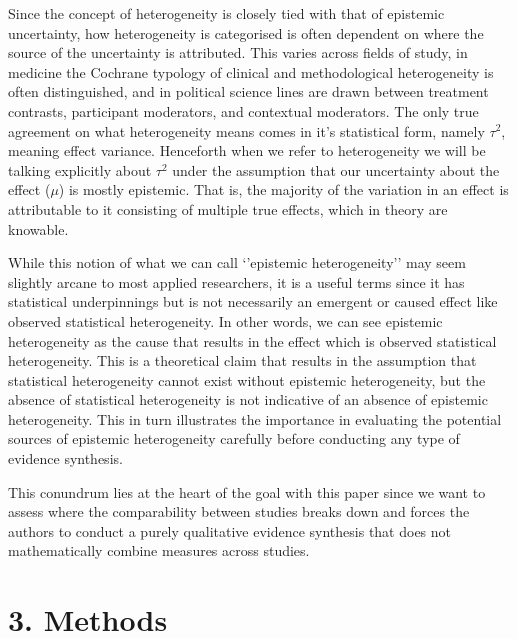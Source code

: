 \documentclass[
  letterpaper,
  DIV=11,
  numbers=noendperiod]{scrartcl}
\begin{document}
Since the concept of heterogeneity is closely tied with that of
epistemic uncertainty, how heterogeneity is categorised is often
dependent on where the source of the uncertainty is attributed. This
varies across fields of study, in medicine the Cochrane typology of
clinical and methodological heterogeneity is often distinguished, and in
political science lines are drawn between treatment contrasts,
participant moderators, and contextual moderators. The only true
agreement on what heterogeneity means comes in it's statistical form,
namely \(\tau^2\), meaning effect variance. Henceforth when we refer to
heterogeneity we will be talking explicitly about \(\tau^2\) under the
assumption that our uncertainty about the effect (\(\mu\)) is mostly
epistemic. That is, the majority of the variation in an effect is
attributable to it consisting of multiple true effects, which in theory
are knowable.

While this notion of what we can call `'epistemic heterogeneity'' may
seem slightly arcane to most applied researchers, it is a useful terms
since it has statistical underpinnings but is not necessarily an
emergent or caused effect like observed statistical heterogeneity. In
other words, we can see epistemic heterogeneity as the cause that
results in the effect which is observed statistical heterogeneity. This
is a theoretical claim that results in the assumption that statistical
heterogeneity cannot exist without epistemic heterogeneity, but the
absence of statistical heterogeneity is not indicative of an absence of
epistemic heterogeneity. This in turn illustrates the importance in
evaluating the potential sources of epistemic heterogeneity carefully
before conducting any type of evidence synthesis.

This conundrum lies at the heart of the goal with this paper since we
want to assess where the comparability between studies breaks down and
forces the authors to conduct a purely qualitative evidence synthesis
that does not mathematically combine measures across studies.

\hypertarget{methods}{%
\section{3. Methods}\label{methods}}
\end{document}
